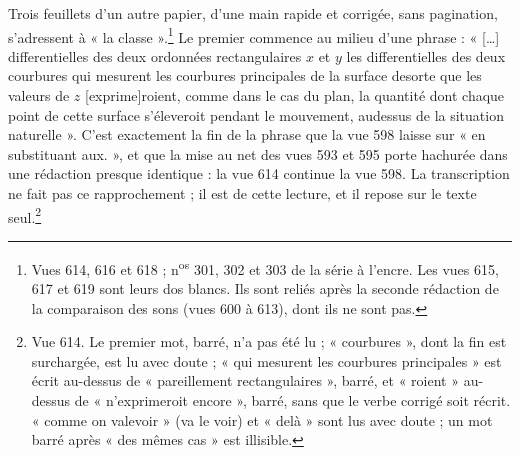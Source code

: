 \documentclass[11pt,a4paper]{article}
\begin{document}
Trois feuillets d'un autre papier, d'une main rapide et corrigée, sans
pagination, s'adressent à « la classe ».\footnote{Vues 614, 616 et 618 ;
n\textsuperscript{os} 301, 302 et 303 de la série à l'encre. Les vues 615, 617 et 619
sont leurs dos blancs. Ils sont reliés après la seconde rédaction de la comparaison
des sons (vues 600 à 613), dont ils ne sont pas.} Le premier commence au milieu d'une
phrase : « […] differentielles des deux ordonnées rectangulaires $x$ et $y$ les
differentielles des deux courbures qui mesurent les courbures principales de la
surface desorte que les valeurs de $z$ [exprime]roient, comme dans le cas du plan, la
quantité dont chaque point de cette surface s'éleveroit pendant le mouvement, audessus
de la situation naturelle ». C'est exactement la fin de la phrase que la vue 598 laisse
sur « en substituant aux. », et que la mise au net des vues 593 et 595 porte hachurée
dans une rédaction presque identique : la vue 614 continue la vue 598. La transcription
ne fait pas ce rapprochement ; il est de cette lecture, et il repose sur le texte
seul.\footnote{Vue 614. Le premier mot, barré, n'a pas été lu ; « courbures », dont
la fin est surchargée, est lu avec doute ; « qui mesurent les courbures principales »
est écrit au-dessus de « pareillement rectangulaires », barré, et « roient »
au-dessus de « n'exprimeroit encore », barré, sans que le verbe corrigé soit
récrit. « comme on valevoir » (va le voir) et « delà » sont lus avec doute ; un mot
barré après « des mêmes cas » est illisible.}
\end{document}

